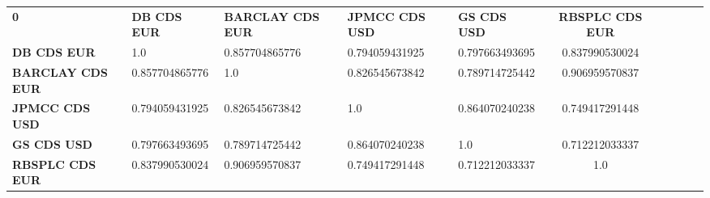 \begin{center}
 \begin{tabular}{|l|l|l|l|l|c|c|c|c|c|}
\hline
\textbf{0} & \textbf{DB CDS EUR} & \textbf{BARCLAY CDS EUR} & \textbf{JPMCC CDS USD} & \textbf{GS CDS USD} & \textbf{RBSPLC CDS EUR}\\\hhline{|=|=|=|=|=|=|}
\textbf{DB CDS EUR} & 1.0 & 0.857704865776 & 0.794059431925 & 0.797663493695 & 0.837990530024\\
\textbf{BARCLAY CDS EUR} & 0.857704865776 & 1.0 & 0.826545673842 & 0.789714725442 & 0.906959570837\\
\textbf{JPMCC CDS USD} & 0.794059431925 & 0.826545673842 & 1.0 & 0.864070240238 & 0.749417291448\\
\textbf{GS CDS USD} & 0.797663493695 & 0.789714725442 & 0.864070240238 & 1.0 & 0.712212033337\\
\textbf{RBSPLC CDS EUR} & 0.837990530024 & 0.906959570837 & 0.749417291448 & 0.712212033337 & 1.0\\
\hline
\end{tabular}
\end{center}
